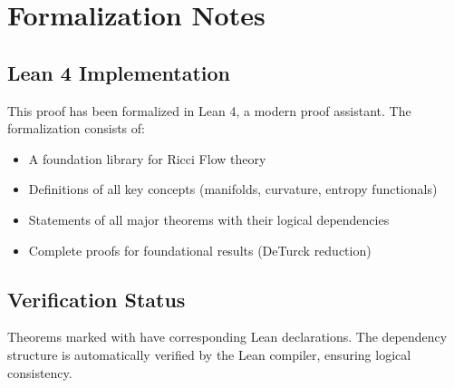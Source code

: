 \chapter{Formalization Notes}
\label{chap:formalization}

\section{Lean 4 Implementation}

This proof has been formalized in Lean 4, a modern proof assistant. The formalization consists of:

\begin{itemize}
\item A foundation library for Ricci Flow theory
\item Definitions of all key concepts (manifolds, curvature, entropy functionals)
\item Statements of all major theorems with their logical dependencies
\item Complete proofs for foundational results (DeTurck reduction)
\end{itemize}

\section{Verification Status}

Theorems marked with \leanok{} have corresponding Lean declarations. The dependency structure is automatically verified by the Lean compiler, ensuring logical consistency.





